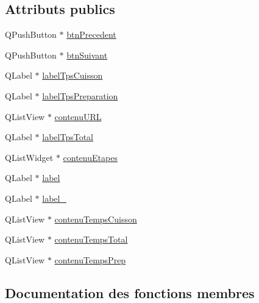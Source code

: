 \subsection*{Attributs publics}
\begin{DoxyCompactItemize}
\item 
Q\+Push\+Button $\ast$ \hyperlink{class_ui___fenetre_etapes_afd2c805beef4f8e6df60ba666e2d9e3e}{btn\+Precedent}
\item 
Q\+Push\+Button $\ast$ \hyperlink{class_ui___fenetre_etapes_ac4cd6163fd1066a242e7b2d7560317fa}{btn\+Suivant}
\item 
Q\+Label $\ast$ \hyperlink{class_ui___fenetre_etapes_a504cc9ecca60aa437626e850cae88c5b}{label\+Tps\+Cuisson}
\item 
Q\+Label $\ast$ \hyperlink{class_ui___fenetre_etapes_ab1994c36dbf7f67f539517c6431cb96b}{label\+Tps\+Preparation}
\item 
Q\+List\+View $\ast$ \hyperlink{class_ui___fenetre_etapes_aa24feeee1b3348435a83ec44571c5f25}{contenu\+U\+RL}
\item 
Q\+Label $\ast$ \hyperlink{class_ui___fenetre_etapes_a3c1c06d0dd2dde35c651ad430dc04bda}{label\+Tps\+Total}
\item 
Q\+List\+Widget $\ast$ \hyperlink{class_ui___fenetre_etapes_a5ca61918507e2eeef4e8e1d47467cc70}{contenu\+Etapes}
\item 
Q\+Label $\ast$ \hyperlink{class_ui___fenetre_etapes_a53eae32c579e7339b50f669828d704d3}{label}
\item 
Q\+Label $\ast$ \hyperlink{class_ui___fenetre_etapes_a58449e87895513ba9014273128385d91}{label\+\_}
\item 
Q\+List\+View $\ast$ \hyperlink{class_ui___fenetre_etapes_a135f3f5bd01ce6b6305b2c5fac8300b7}{contenu\+Temps\+Cuisson}
\item 
Q\+List\+View $\ast$ \hyperlink{class_ui___fenetre_etapes_a408df57a10027aa8dc496185822b0f22}{contenu\+Temps\+Total}
\item 
Q\+List\+View $\ast$ \hyperlink{class_ui___fenetre_etapes_ab6a00c484db7168498bffe4e8ccc5547}{contenu\+Temps\+Prep}
\end{DoxyCompactItemize}


\subsection{Documentation des fonctions membres}
\mbox{\label{class_ui___fenetre_etapes_a12b8a73438c7adfe883f9deb6af95426}} 
